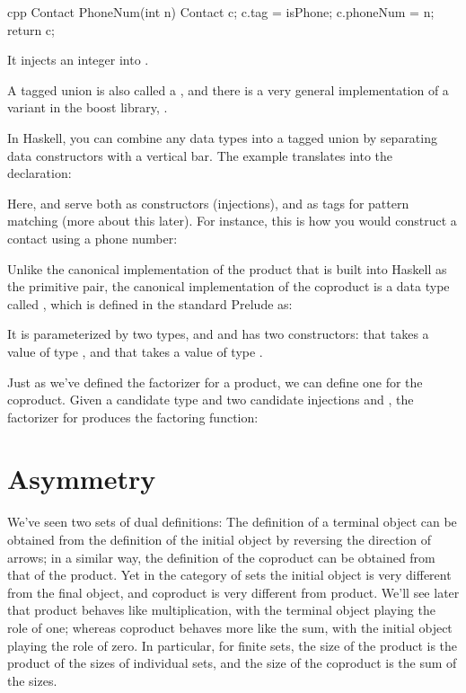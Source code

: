 \begin{snip}{cpp}
Contact PhoneNum(int n) {
    Contact c;
    c.tag = isPhone;
    c.phoneNum = n;
    return c;
}
\end{snip}
It injects an integer into .

A tagged union is also called a , and there is a very
general implementation of a variant in the boost library,
.

In Haskell, you can combine any data types into a tagged union by
separating data constructors with a vertical bar. The 
example translates into the declaration:

Here,  and  serve both as
constructors (injections), and as tags for pattern matching (more about
this later). For instance, this is how you would construct a contact
using a phone number:

Unlike the canonical implementation of the product that is built into
Haskell as the primitive pair, the canonical implementation of the
coproduct is a data type called , which is defined in the
standard Prelude as:

It is parameterized by two types,  and  and has two
constructors:  that takes a value of type , and
 that takes a value of type .

Just as we've defined the factorizer for a product, we can define one
for the coproduct. Given a candidate type  and two candidate
injections  and , the factorizer for 
produces the factoring function:


\section{Asymmetry}

We've seen two sets of dual definitions: The definition of a terminal
object can be obtained from the definition of the initial object by
reversing the direction of arrows; in a similar way, the definition of
the coproduct can be obtained from that of the product. Yet in the
category of sets the initial object is very different from the final
object, and coproduct is very different from product. We'll see later
that product behaves like multiplication, with the terminal object
playing the role of one; whereas coproduct behaves more like the sum,
with the initial object playing the role of zero. In particular, for
finite sets, the size of the product is the product of the sizes of
individual sets, and the size of the coproduct is the sum of the sizes.

